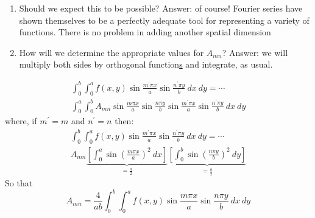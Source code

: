 \begin{enumerate}

\item Should we expect this to be possible?  Answer: of course!  Fourier series have shown themselves to be a perfectly adequate tool for representing a variety of functions.  There is no problem in adding another spatial dimension

\item How will we determine the appropriate values for $A_{mn}$?  Answer: we will multiply both sides by orthogonal function\underline{s} and integrate, as usual.

\end{enumerate}
\begin{multline*}
\int_0^b \int_0^a f(x,y) \sin{\frac{m^{\prime} \pi x}{a}} \sin{\frac{n^{\prime} \pi y}{b}} \ dx \ dy = \cdots \\ \int_0^a \int_0^b A_{mn}\sin{\frac{m \pi x}{a}} \sin{\frac{n \pi y}{b}}\sin{\frac{m^{\prime} \pi x}{a}} \sin{\frac{n^{\prime} \pi y}{b}} \ dx \ dy
\end{multline*}
where, if $m^{\prime}=m$ and $n^{\prime} = n$ then:
\begin{multline*}
\int_0^b \int_0^a f(x,y) \sin{\frac{m^{\prime} \pi x}{a}} \sin{\frac{n^{\prime} \pi y}{b}} \ dx \ dy = \cdots \\ A_{mn} \underbrace{\left[\int_0^a \sin{(\frac{m \pi x}{a})}^2 \ dx \right]}_{=\frac{a}{2}} \underbrace{ \left[ \int_0^b \sin{(\frac{n \pi y}{b})}^2 \ dy \right]}_{=\frac{b}{2}}
\end{multline*}
So that
\begin{equation}
A_{mn} = \frac{4}{a b} \int_0^b \int_0^a f(x,y) \sin{\frac{m \pi x}{a}} \sin{\frac{n \pi y}{b}} \ dx \ dy
\label{eq:double-fourier-coeff}
\end{equation}

